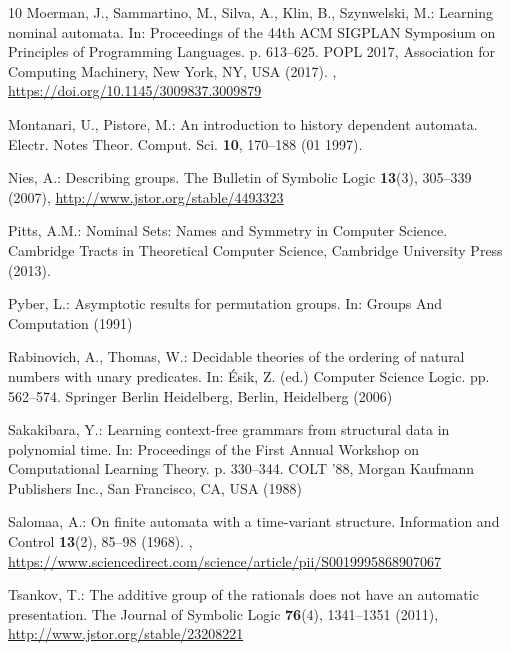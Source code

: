 \documentclass[11pt,a4paper]{amsart}
\theoremstyle{definition}
\begin{document}
\begin{thebibliography}{10}
Moerman, J., Sammartino, M., Silva, A., Klin, B., Szynwelski, M.: Learning
  nominal automata. In: Proceedings of the 44th ACM SIGPLAN Symposium on
  Principles of Programming Languages. p. 613–625. POPL 2017, Association for
  Computing Machinery, New York, NY, USA (2017). ,
  \url{https://doi.org/10.1145/3009837.3009879}

Montanari, U., Pistore, M.: An introduction to history dependent automata.
  Electr. Notes Theor. Comput. Sci.  \textbf{10},  170--188 (01 1997).

Nies, A.: Describing groups. The Bulletin of Symbolic Logic  \textbf{13}(3),
  305--339 (2007), \url{http://www.jstor.org/stable/4493323}

Pitts, A.M.: Nominal Sets: Names and Symmetry in Computer Science. Cambridge
  Tracts in Theoretical Computer Science, Cambridge University Press (2013).

Pyber, L.: Asymptotic results for permutation groups. In: Groups And
  Computation (1991)

Rabinovich, A., Thomas, W.: Decidable theories of the ordering of natural
  numbers with unary predicates. In: {\'E}sik, Z. (ed.) Computer Science Logic.
  pp. 562--574. Springer Berlin Heidelberg, Berlin, Heidelberg (2006)

Sakakibara, Y.: Learning context-free grammars from structural data in
  polynomial time. In: Proceedings of the First Annual Workshop on
  Computational Learning Theory. p. 330–344. COLT '88, Morgan Kaufmann
  Publishers Inc., San Francisco, CA, USA (1988)

Salomaa, A.: On finite automata with a time-variant structure. Information and
  Control  \textbf{13}(2),  85--98 (1968).
  ,
  \url{https://www.sciencedirect.com/science/article/pii/S0019995868907067}

Tsankov, T.: The additive group of the rationals does not have an automatic
  presentation. The Journal of Symbolic Logic  \textbf{76}(4),  1341--1351
  (2011), \url{http://www.jstor.org/stable/23208221}

\end{thebibliography}
\end{document}
